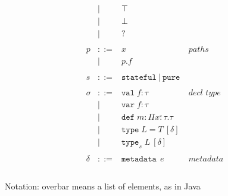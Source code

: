 \documentclass{article}
\newcommand{\keywadj}[1]{\mathtt{#1}}
\newcommand{\keyw}[1]{\keywadj{#1}~}
\begin{document}
\[\begin{array}{lll}
\begin{array}{lllr}
     & |   & \top                                                  &\\
     & |   & \bot                                                  &\\
     & |   & ?                                                     &\\
&&\\
p & ::= & x   & paths \\
  & |   & p.f &\\
&&\\
s & ::= & \keyw{stateful} | ~\keyw{pure} \\
&&\\
\sigma & ::= & \texttt{val} \; f:\tau                           & \textit{decl type}\\
       & |   & \texttt{var} \; f:\tau                           &\\
       & |   & \texttt{def} \; m:\Pi \overline{x{:}\tau} . \tau &\\
       & |   & \texttt{type} \; L = T ~[\delta]                 &\\
       & |   & \texttt{type}_{s} \; L ~[\delta]                 &\\
&&\\
\delta & ::= & \keyw{metadata} ~e & metadata \\
&&\\
\end{array}
\end{array}
\]

Notation: overbar means a list of elements, as in Java
\end{document}

